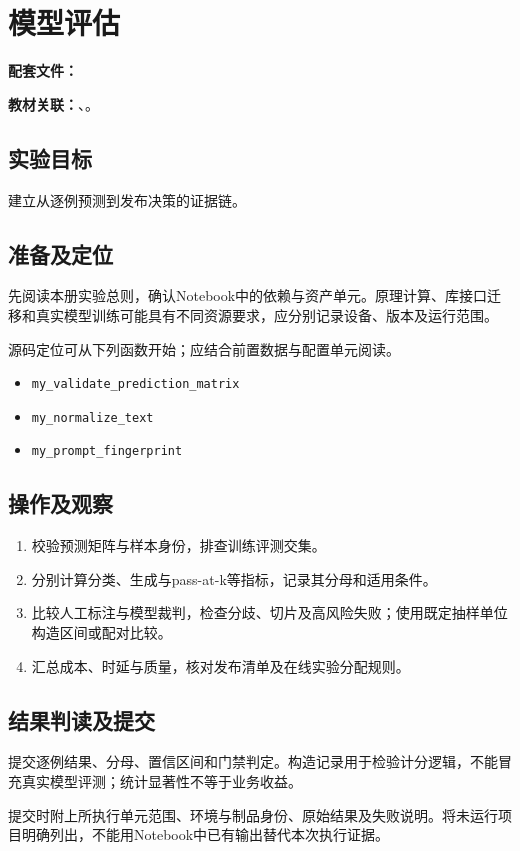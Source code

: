 \chapter{模型评估}
\label{lab:50_model_evaluation}

\noindent\textbf{配套文件：}\par
\noindent\textbf{教材关联：}、。

\section*{实验目标}
建立从逐例预测到发布决策的证据链。

\section*{准备及定位}
先阅读本册实验总则，确认Notebook中的依赖与资产单元。原理计算、库接口迁移和真实模型训练可能具有不同资源要求，应分别记录设备、版本及运行范围。

源码定位可从下列函数开始；应结合前置数据与配置单元阅读。
\begin{itemize}
\item \texttt{my\_validate\_prediction\_matrix}
\item \texttt{my\_normalize\_text}
\item \texttt{my\_prompt\_fingerprint}
\end{itemize}

\section*{操作及观察}
\begin{enumerate}
\item 校验预测矩阵与样本身份，排查训练评测交集。
\item 分别计算分类、生成与pass-at-k等指标，记录其分母和适用条件。
\item 比较人工标注与模型裁判，检查分歧、切片及高风险失败；使用既定抽样单位构造区间或配对比较。
\item 汇总成本、时延与质量，核对发布清单及在线实验分配规则。
\end{enumerate}

\section*{结果判读及提交}
提交逐例结果、分母、置信区间和门禁判定。构造记录用于检验计分逻辑，不能冒充真实模型评测；统计显著性不等于业务收益。

提交时附上所执行单元范围、环境与制品身份、原始结果及失败说明。将未运行项目明确列出，不能用Notebook中已有输出替代本次执行证据。
